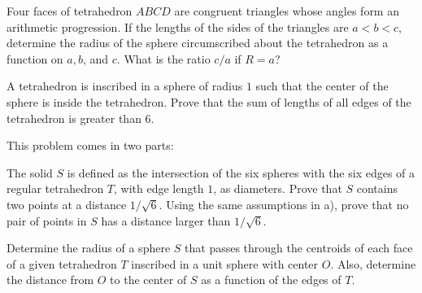 \documentclass[12pt,a4paper]{memoir}
\theoremstyle{definition}
\begin{document}
\begin{question}[name={1983 IMO Longlist}]
	Four faces of tetrahedron $ABCD$ are congruent triangles whose angles form an arithmetic progression. If the lengths of the sides of the triangles are $a < b < c$, determine the radius of the sphere circumscribed about the tetrahedron as a function on $a, b$, and $c$. What is the ratio $c/a$ if $R = a$?
\end{question}


\begin{question}[name={1984 IMO Longlist}]
	A tetrahedron is inscribed in a sphere of radius $1$ such that the center of the sphere is inside the tetrahedron. Prove that the sum of lengths of all edges of the tetrahedron is greater than $6$.
\end{question}



\begin{question}[name={1985 IMO Longlist}]
	This problem comes in two parts:
	\begin{tasks}
		\task The solid $S$ is defined as the intersection of the six spheres with the six edges of a regular tetrahedron $T$, with edge length $1$, as diameters. Prove that $S$ contains two points at a distance $1/\sqrt 6$.
		\task Using the same assumptions in a), prove that no pair of points in $S$ has a distance larger than $1/\sqrt 6$.
	\end{tasks}
\end{question}




\begin{question}[name={1985 IMO Longlist}]
	Determine the radius of a sphere $S$ that passes through the centroids of each face of a given tetrahedron $T$ inscribed in a unit sphere with center $O$. Also, determine the distance from $O$ to the center of $S$ as a function of the edges of $T$.
\end{question}
\end{document}
